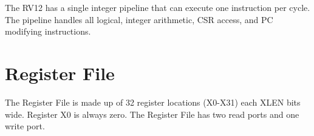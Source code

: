 The RV12 has a single integer pipeline that can execute one instruction per
cycle. The pipeline handles all logical, integer arithmetic, CSR access, and PC
modifying instructions.


\section{Register File}\label{register-file}

The Register File is made up of 32 register locations (X0-X31) each XLEN
bits wide. Register X0 is always zero. The Register File has two read
ports and one write port.
